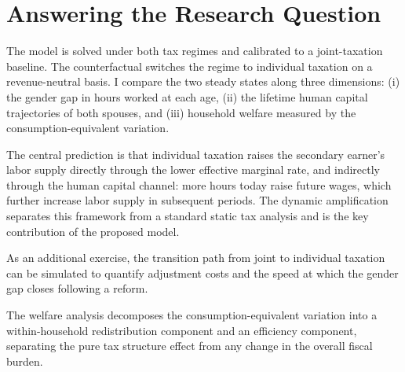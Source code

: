 \section{Answering the Research Question}

The model is solved under both tax regimes and calibrated to a joint-taxation baseline.
The counterfactual switches the regime to individual taxation on a revenue-neutral basis.
I compare the two steady states along three dimensions: (i) the gender gap in hours worked at each age, (ii) the lifetime human capital trajectories of both spouses, and (iii) household welfare measured by the consumption-equivalent variation.

\noindent The central prediction is that individual taxation raises the secondary earner's labor supply directly through the lower effective marginal rate, and indirectly through the human capital channel: more hours today raise future wages, which further increase labor supply in subsequent periods.
The dynamic amplification separates this framework from a standard static tax analysis and is the key contribution of the proposed model.

\noindent As an additional exercise, the transition path from joint to individual taxation can be simulated to quantify adjustment costs and the speed at which the gender gap closes following a reform.

\noindent The welfare analysis decomposes the consumption-equivalent variation into a within-household redistribution component and an efficiency component, separating the pure tax structure effect from any change in the overall fiscal burden.
